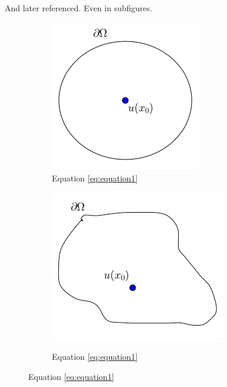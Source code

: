 And later referenced. Even in subfigures.
\begin{figure}[!htb]
  \centering
  \begin{subfigure}[b]{0.3\textwidth}
    \centering
  \includegraphics[width=\textwidth]{images/CircCenter}
  \caption{Equation \ref{eq:equation1}}\label{fig:circcenter}
\end{subfigure}
\hfill
  \begin{subfigure}[b]{0.3\textwidth}
    \centering
  \includegraphics[width=\textwidth]{images/GeneralOffset}
  \label{fig:generaloffset}
  \caption{Equation \ref{eq:equation1}}
\end{subfigure}
\end{figure}
